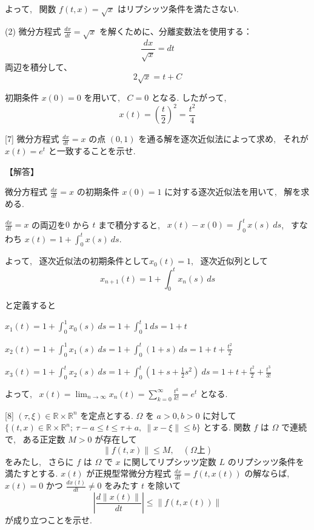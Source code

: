 \documentclass{jsarticle}
\begin{document}
よって, \ 関数 $f(t, x) = \sqrt{x}$ はリプシッツ条件を満たさない.

\bigskip

(2)
微分方程式 $\frac{dx}{dt} = \sqrt{x}$ を解くために、分離変数法を使用する：
        \[
        \frac{dx}{\sqrt{x}} = dt
        \]
        両辺を積分して、
        \[
        2\sqrt{x} = t + C
        \]

        初期条件 $x(0) = 0$ を用いて, \ $C = 0$ となる. したがって, 
        \[
        x(t) = \left( \frac{t}{2} \right)^2 = \frac{t^2}{4}
        \]

  
\bigskip
\bigskip

\begin{itembox}[l]{[7]}
微分方程式 $\displaystyle \frac{dx}{dt} = x$ の点 $(0,1)$ を通る解を逐次近似法によって求め, \ それが $x(t) = e^t$ と一致することを示せ.
\end{itembox}

【解答】

微分方程式 $\frac{dx}{dt} = x$ の初期条件 $x(0) = 1$ に対する逐次近似法を用いて, \ 解を求める.

$\frac{dx}{dt} = x$ の両辺を$0$ から $t$ まで積分すると, \ 
$x(t) - x(0) = \displaystyle \int_0^t x(s) \ ds$, \ すなわち
$x(t) = 1 + \displaystyle \int_0^t x(s) \ ds$.

よって, \ 逐次近似法の初期条件として$x_0(t) = 1$, \ 逐次近似列として
    \[
    x_{n+1}(t) = 1 + \int_0^t x_n(s) \, ds
    \]

と定義すると
  
$x_1(t) = 1 + \displaystyle \int_0^1 x_0(s) \ ds
= 1 + \displaystyle \int_0^t 1 \, ds = 1 + t$

$x_2(t) = 1 + \displaystyle \int_0^1 x_1(s) \ ds
= 1 + \displaystyle \int_0^t (1 + s) \, ds = 1 + t + \frac{t^2}{2}$

$x_3(t) = 1 + \displaystyle \int_0^t x_2(s) \ ds
= 1 + \int_0^t (1 + s + \frac{1}{2} s^2) \ ds
= 1 + t + \displaystyle \frac{t^2}{2} + \frac{t^3}{3!}$

よって, \ $x(t) = \displaystyle \lim_{n \to \infty} x_n(t)
= \sum_{k=0}^{\infty} \frac{t^k}{k!} = e^t$ となる.
  
\bigskip
\bigskip

\begin{itembox}[l]{[8]}
$(\tau, \xi) \in \mathbb{R} \times \mathbb{R}^n$ を定点とする. 
$\Omega$ を $a > 0, b > 0$ に対して $\{(t,x) \in \mathbb{R} \times \mathbb{R}^n; \  \tau - a \leq t \leq \tau + a, \ \|x - \xi\| \leq b\} $ とする. 関数 $f$ は $\Omega$ で連続で, \ ある正定数 $M > 0$ が存在して
    \[
    \|f(t,x)\| \leq M, \quad (\Omega 上)
    \]
をみたし, \ さらに $f$ は $\Omega$ で $x$ に関してリプシッツ定数 $L$ のリプシッツ条件を満たすとする. $x(t)$ が正規型常微分方程式 $\frac{dx}{dt} = f(t, x(t))$ の解ならば, \ $x(t) = 0$ かつ $\displaystyle \frac{dx(t)}{dt} \neq 0$ をみたす $t$ を除いて
    \[
    \left| \frac{d\|x(t)\|}{dt} \right| \leq \|f(t, x(t))\|
    \]
    が成り立つことを示せ.
\end{itembox}  
\end{document}

